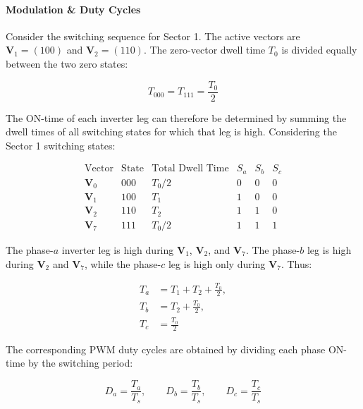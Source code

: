 \documentclass{article}
\begin{document}
\paragraph{Modulation \& Duty Cycles}
\label{sec:space-vector-modulation}

Consider the switching sequence for Sector 1. The active vectors are $\mathbf{V}_1=(100)$ and $\mathbf{V}_2=(110)$. The zero-vector dwell time $T_0$ is divided equally between the two zero states:

\begin{equation}
    T_{000} = T_{111} = \frac{T_0}{2}
\end{equation}

The ON-time of each inverter leg can therefore be determined by summing the dwell times of all switching states for which that leg is high. Considering the Sector 1 switching states:

\[
\begin{array}{c|c|c|ccc}
    \text{Vector} & \text{State} & \text{Total Dwell Time}
    & S_a & S_b & S_c \\
    \hline
    \mathbf{V}_0 & 000 & T_0/2 & 0 & 0 & 0 \\
    \mathbf{V}_1 & 100 & T_1   & 1 & 0 & 0 \\
    \mathbf{V}_2 & 110 & T_2   & 1 & 1 & 0 \\
    \mathbf{V}_7 & 111 & T_0/2 & 1 & 1 & 1
\end{array}
\]

The phase-$a$ inverter leg is high during $\mathbf{V}_1$, $\mathbf{V}_2$, and $\mathbf{V}_7$. The phase-$b$ leg is high during $\mathbf{V}_2$ and $\mathbf{V}_7$, while the phase-$c$ leg is high only during $\mathbf{V}_7$. Thus:

\begin{align}
    T_a &= T_1 + T_2 + \frac{T_0}{2}, \\
    T_b &= T_2 + \frac{T_0}{2}, \\
    T_c &= \frac{T_0}{2}
\end{align}

The corresponding PWM duty cycles are obtained by dividing each phase ON-time by the switching period:

\begin{equation}
    D_a = \frac{T_a}{T_s}, \qquad
    D_b = \frac{T_b}{T_s}, \qquad
    D_c = \frac{T_c}{T_s}
\end{equation}
\end{document}
